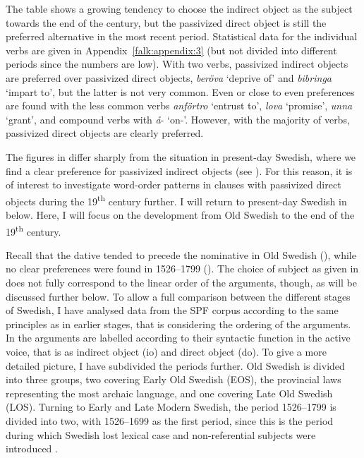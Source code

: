 \documentclass[output=paper]{langscibook}
\begin{document}
The table shows a growing tendency to choose the indirect object as the subject towards the end of the century, but the passivized direct object is still the preferred alternative in the most recent period. Statistical data for the individual verbs are given in Appendix~\ref{falk:appendix:3} (but not divided into different periods since the numbers are low). With two verbs, passivized indirect objects are preferred over passivized direct objects, \textit{beröva} ‘deprive of’ and \textit{bibringa} ‘impart to’, but the latter is not very common. Even or close to even preferences are found with the less common verbs \textit{anförtro} ‘entrust to’, \textit{lova} ‘promise’, \textit{unna} ‘grant’, and compound verbs with \textit{å}{}- ‘on-’. However, with the majority of verbs, passivized direct objects are clearly preferred.\largerpage


The figures in  differ sharply from the situation in present-day Swedish, where we find a clear preference for passivized indirect objects (see ). For this reason, it is of interest to investigate word-order patterns in clauses with passivized direct objects during the 19\textsuperscript{th} century further. I will return to present-day Swedish in  below. Here, I will focus on the development from Old Swedish to the end of the 19\textsuperscript{th} century.



Recall that the dative tended to precede the nominative in Old Swedish (), while no clear preferences were found in 1526–1799 (). The choice of subject as given in  does not fully correspond to the linear order of the arguments, though, as will be discussed further below. To allow a full comparison between the different stages of Swedish, I have analysed data from the SPF corpus according to the same principles as in earlier stages, that is considering the ordering of the arguments. In  the arguments are labelled according to their syntactic function in the active voice, that is as indirect object (io) and direct object (do). To give a more detailed picture, I have subdivided the periods further. Old Swedish is divided into three groups, two covering Early Old Swedish (EOS), the provincial laws representing the most archaic language, and one covering Late Old Swedish (LOS). Turning to Early and Late Modern Swedish, the period 1526–1799 is divided into two, with 1526–1699 as the first period, since this is the period during which Swedish lost lexical case and non-referential subjects were introduced \citep{Falk1993}.
\end{document}
